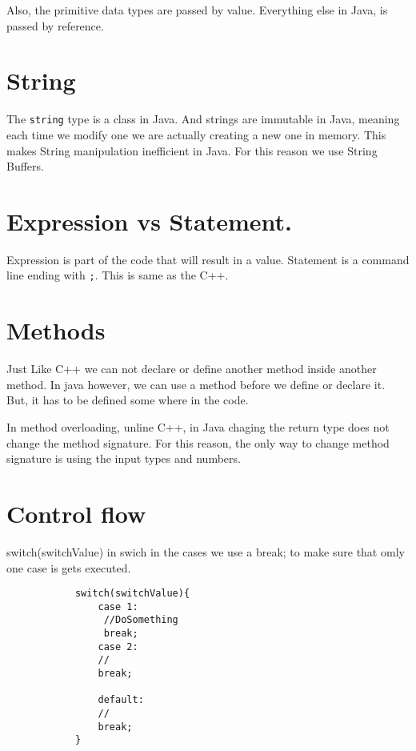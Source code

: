 \documentclass[11pt,twoside,a4paper]{report}
\begin{document}
        Also, the primitive data types are passed by value. Everything else in Java, is passed by reference.
        
    \section{String}
        The \verb|string| type is a class in Java. And strings are immutable in Java, meaning each time we modify one we are actually creating a new one in memory.
        This makes String manipulation inefficient in Java. For this reason we use String Buffers.
        
    \section{Expression vs Statement.}
        Expression is part of the code that will result in a value.
        Statement is a command line ending with \verb|;|. This is same as the C++.

    \section{Methods}
        Just Like C++ we can not declare or define another method inside another method. In java however, we can use a method before we define or declare it. But, it has to be defined some where in the code.

        In method overloading, unline C++, in Java chaging the return type does not change the method signature. For this reason, the only way to change method signature is using the input types and numbers.
    
    \section{Control flow}
        switch(switchValue) in swich in the cases we use a break; to make sure that omly one case is gets executed.
        \begin{lstlisting}
            switch(switchValue){
                case 1:
                 //DoSomething
                 break;
                case 2:
                //
                break;
                
                default:
                //
                break;
            }
            \end{lstlisting}
\end{document}
